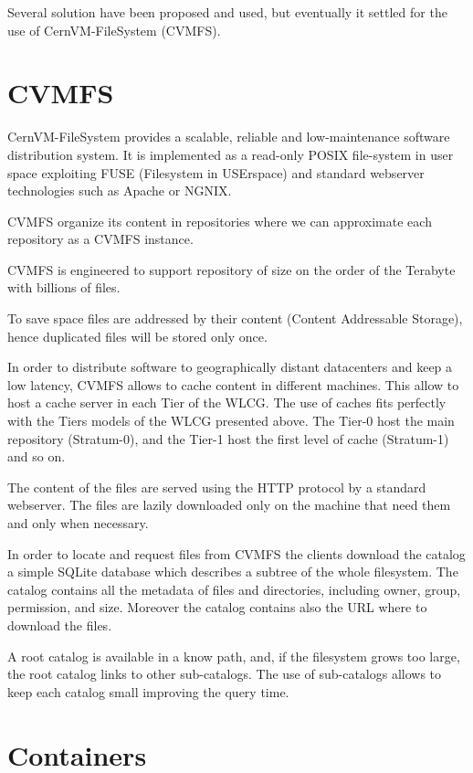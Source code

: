 Several solution have been proposed and used, but eventually it settled for the use of CernVM-FileSystem (CVMFS).

\section{CVMFS}

CernVM-FileSystem provides a scalable, reliable and low-maintenance software distribution system. It is implemented as a read-only POSIX file-system in user space exploiting FUSE (Filesystem in USErspace) and standard webserver technologies such as Apache or NGNIX.

CVMFS organize its content in repositories where we can approximate each repository as a CVMFS instance.

CVMFS is engineered to support repository of size on the order of the Terabyte with billions of files.

To save space files are addressed by their content (Content Addressable Storage), hence duplicated files will be stored only once.

In order to distribute software to geographically distant datacenters and keep a low latency, CVMFS allows to cache content in different machines. This allow to host a cache server in each Tier of the WLCG. The use of caches fits perfectly with the Tiers models of the WLCG presented above. The Tier-0 host the main repository (Stratum-0), and the Tier-1 host the first level of cache (Stratum-1) and so on.

The content of the files are served using the HTTP protocol by a standard webserver. The files are lazily downloaded only on the machine that need them and only when necessary.

In order to locate and request files from CVMFS the clients download the catalog a simple SQLite database which describes a subtree of the whole filesystem.
The catalog contains all the metadata of files and directories, including owner, group, permission, and size. Moreover the catalog contains also the URL where to download the files.

A root catalog is available in a know path, and, if the filesystem grows too large, the root catalog links to other sub-catalogs. The use of sub-catalogs allows to keep each catalog small improving the query time.

\section{Containers}

